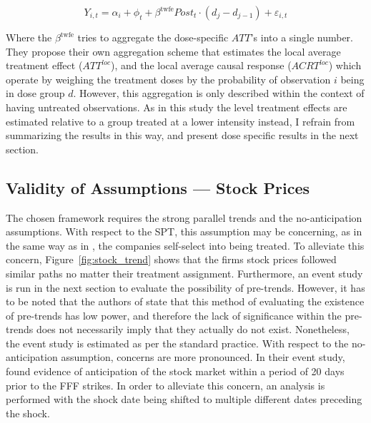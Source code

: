 \documentclass[12pt]{article}
\begin{document}
\begin{equation}
    Y_{i,t} = \alpha_i + \phi_t +  \beta^{\text{twfe}} Post_t \cdot (d_j - d_{j-1}) + \varepsilon_{i,t}
\end{equation}

Where the $\beta^{\text{twfe}}$ tries to aggregate the dose-specific $ATT$'s into a single number. They propose their own aggregation scheme that estimates the local average treatment effect ($ATT^{loc}$), and the local average causal response ($ACRT^{loc}$) which operate by weighing the treatment doses by the probability of observation $i$ being in dose group $d$. However, this aggregation is only described within the context of having untreated observations. As in this study the level treatment effects are estimated relative to a group treated at a lower intensity instead, I refrain from summarizing the results in this way, and present dose specific results in the next section.


\subsection{Validity of Assumptions --- Stock Prices}

The chosen framework requires the strong parallel trends and the no-anticipation assumptions. With respect to the SPT, this assumption may be concerning, as in the same way as in \textcite{koenigImpulsePurchasesGun2023}, the companies self-select into being treated. To alleviate this concern, Figure~\ref{fig:stock_trend} shows that the firms stock prices followed similar paths no matter their treatment assignment.
Furthermore, an event study is run in the next section to evaluate the possibility of pre-trends. However, it has to be noted that the authors of \textcite{callawayDifferenceinDifferencesContinuousTreatment2025} state that this method of evaluating the existence of pre-trends has low power, and therefore the lack of significance within the pre-trends does not necessarily imply that they actually do not exist. Nonetheless, the event study is estimated as per the standard practice.
With respect to the no-anticipation assumption, concerns are more pronounced. In their event study, \textcite{schusterStockPriceReactions2023} found evidence of anticipation of the stock market within a period of 20 days prior to the FFF strikes. In order to alleviate this concern, an analysis is performed with the shock date being shifted to multiple different dates preceding the shock.
\end{document}
